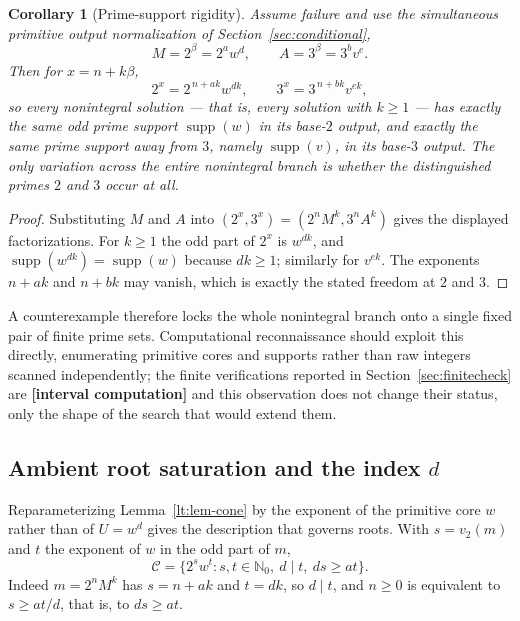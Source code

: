 \documentclass[11pt,oneside]{article}
\newtheorem{corollary}[theorem]{Corollary}
\theoremstyle{definition}
\theoremstyle{remark}
\newcommand{\Nzero}{\mathbb N_0}
\newcommand{\Cand}{\mathcal C}
\newcommand{\vpp}[2]{v_{#1}\!\left(#2\right)}
\newcommand{\statuscomp}{\textcolor{computeviolet}{\textbf{[interval computation]}}}
\begin{document}
\begin{corollary}[Prime-support rigidity]
\label{lt:cor-prime-support}
Assume failure and use the simultaneous primitive output normalization of
Section~\ref{sec:conditional},
\[
 M=2^{\beta}=2^aw^d,
 \qquad
 A=3^{\beta}=3^bv^e .
\]
Then for $x=n+k\beta$,
\[
 2^x=2^{\,n+ak}w^{dk},
 \qquad
 3^x=3^{\,n+bk}v^{ek},
\]
so every nonintegral solution --- that is, every solution with $k\ge1$ --- has exactly the same
odd prime support $\operatorname{supp}(w)$ in its base-$2$ output, and exactly the same prime
support away from $3$, namely $\operatorname{supp}(v)$, in its base-$3$ output.  The only
variation across the entire nonintegral branch is whether the distinguished primes $2$ and $3$
occur at all.
\end{corollary}

\begin{proof}
Substituting $M$ and $A$ into $(2^x,3^x)=(2^nM^k,3^nA^k)$ gives the displayed factorizations.
For $k\ge1$ the odd part of $2^x$ is $w^{dk}$, and
$\operatorname{supp}(w^{dk})=\operatorname{supp}(w)$ because $dk\ge1$; similarly for $v^{ek}$.
The exponents $n+ak$ and $n+bk$ may vanish, which is exactly the stated freedom at $2$ and $3$.
\end{proof}

A counterexample therefore locks the whole nonintegral branch onto a single fixed pair of finite
prime sets.  Computational reconnaissance should exploit this directly, enumerating primitive
cores and supports rather than raw integers scanned independently; the finite verifications
reported in Section~\ref{sec:finitecheck} are \statuscomp{} and this observation does not change
their status, only the shape of the search that would extend them.

\subsection{Ambient root saturation and the index \texorpdfstring{$d$}{d}}

Reparameterizing Lemma~\ref{lt:lem-cone} by the exponent of the primitive core $w$ rather than
of $U=w^d$ gives the description that governs roots.  With $s=\vpp{2}{m}$ and $t$ the exponent
of $w$ in the odd part of $m$,
\begin{equation}
 \Cand=\{2^sw^t:s,t\in\Nzero,\ d\mid t,\ ds\ge at\}.
 \label{lt:eq-candidate-cone}
\end{equation}
Indeed $m=2^nM^k$ has $s=n+ak$ and $t=dk$, so $d\mid t$, and $n\ge0$ is equivalent to
$s\ge at/d$, that is, to $ds\ge at$.
\end{document}
